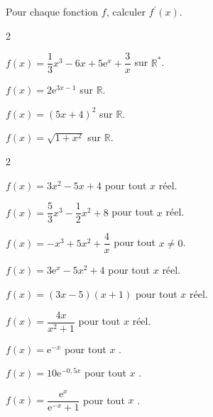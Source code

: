 \documentclass[11pt,a4paper]{article}  %
\begin{document}
	\graphicspath{{images/}}
	
	\begin{center}
		
		
	\end{center}

\exerciceDS{}

Pour chaque fonction $f$, calculer $f^{\prime}(x)$.
\begin{multicols}{2}
	\begin{enumMet}
	\item $f(x)=\dfrac{1}{3} x^3-6 x+5 \mathrm{e}^x+\dfrac{3}{x}$ sur $\mathbb{R}^*$.
	\item $f(x)=2 \mathrm{e}^{3 x-1}$ sur $\mathbb{R}$.
	\item $f(x)=(5 x+4)^2$ sur $\mathbb{R}$.
	\item $f(x)=\sqrt{1+x^2}$ sur $\mathbb{R}$.
\end{enumMet}
\end{multicols}




\begin{multicols}{2}
	\begin{enumMet}
	\item $f(x)=3 x^2-5 x+4$ pour tout $x$ réel.
	\item $f(x)=\dfrac{5}{3} x^3-\dfrac{1}{2} x^2+8$ pour tout $x$ réel.
	\item $f(x)=-x^3+5 x^2+\dfrac{4}{x}$ pour tout $x \neq 0$.
	\item $f(x)=3 \mathrm{e}^x-5 x^2+4$ pour tout $x$ réel.
	\item $f(x)=(3 x-5)(x+1)$ pour tout $x$ réel.
	\item $f(x)=\dfrac{4 x}{x^2+1}$ pour tout $x$ réel.
\end{enumMet}
\end{multicols}

\begin{enumMet}
	\item $f(x)=\mathrm{e}^{-x}$ pour tout $x$ .
	\item $f(x)=10 \mathrm{e}^{-0,5 x}$ pour tout $x$ .
	\item $f(x)=\dfrac{\mathrm{e}^x}{\mathrm{e}^{-x}+1}$ pour tout $x$ .
\end{enumMet}
\end{document}
